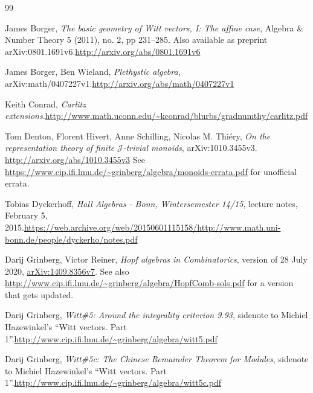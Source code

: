 \documentclass[numbers=enddot,12pt,final,onecolumn,notitlepage]{scrartcl}%
\theoremstyle{definition}
\begin{document}
\begin{thebibliography}{99}                                                                                               %


James Borger, \textit{The basic geometry of Witt vectors, I:
The affine case}, Algebra \& Number Theory 5 (2011), no. 2, pp 231--285. Also
available as preprint arXiv:0801.1691v6.\newline\url{http://arxiv.org/abs/0801.1691v6}

James Borger, Ben Wieland, \textit{Plethystic algebra},
arXiv:math/0407227v1.\newline\url{http://arxiv.org/abs/math/0407227v1}

Keith Conrad, \textit{Carlitz extensions}.\newline\url{http://www.math.uconn.edu/~kconrad/blurbs/gradnumthy/carlitz.pdf}

Tom Denton, Florent Hivert, Anne Schilling, Nicolas M.
Thi\'{e}ry, \textit{On the representation theory of finite }$\mathcal{J}%
$\textit{-trivial monoids}, arXiv:1010.3455v3.
\url{http://arxiv.org/abs/1010.3455v3} \newline See
\url{https://www.cip.ifi.lmu.de/~grinberg/algebra/monoids-errata.pdf} for
unofficial errata.

Tobias Dyckerhoff, \textit{Hall Algebras - Bonn,
Wintersemester 14/15}, lecture notes, February 5, 2015.\newline\url{https://web.archive.org/web/20150601115158/http://www.math.uni-bonn.de/people/dyckerho/notes.pdf}

Darij Grinberg, Victor Reiner, \textit{Hopf algebras in
Combinatorics}, version of 28 July 2020,
\href{http://arxiv.org/abs/1409.8356v7}{arXiv:1409.8356v7}. \newline See also
\url{http://www.cip.ifi.lmu.de/~grinberg/algebra/HopfComb-sols.pdf} for a
version that gets updated.

Darij Grinberg, \textit{Witt\#5: Around the integrality
criterion 9.93}, sidenote to Michiel Hazewinkel's \textquotedblleft Witt
vectors. Part 1\textquotedblright.\newline\url{http://www.cip.ifi.lmu.de/~grinberg/algebra/witt5.pdf}

Darij Grinberg, \textit{Witt\#5c: The Chinese Remainder
Theorem for Modules}, sidenote to Michiel Hazewinkel's \textquotedblleft Witt
vectors. Part 1\textquotedblright.\newline\url{http://www.cip.ifi.lmu.de/~grinberg/algebra/witt5c.pdf}


\end{thebibliography}
\end{document}
